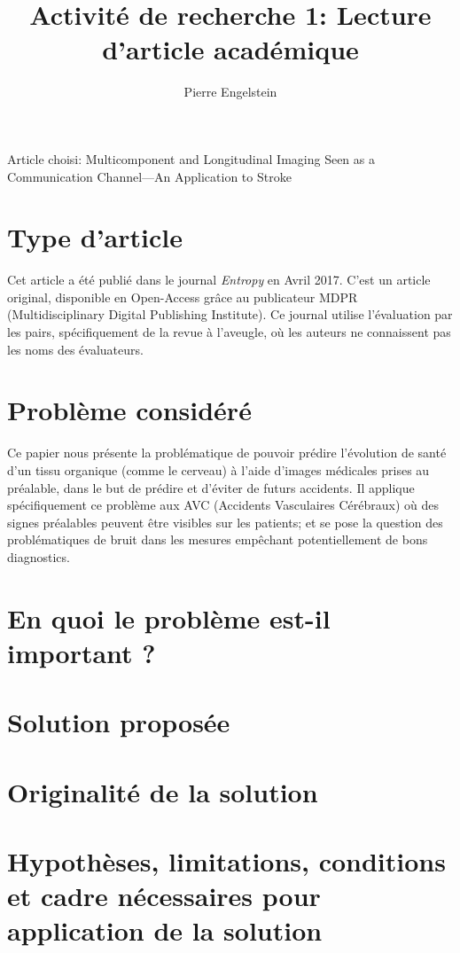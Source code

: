 \documentclass[12pt,a4paper]{article}
\title{Activité de recherche 1: Lecture d'article académique}
\author{Pierre Engelstein}
\date{}
\begin{document}
\maketitle

Article choisi: Multicomponent and Longitudinal Imaging Seen as a Communication Channel—An Application to Stroke

\section{Type d'article}

Cet article a été publié dans le journal \textit{Entropy} en Avril 2017. C'est un article original, disponible en Open-Access grâce au publicateur MDPR (Multidisciplinary Digital Publishing Institute). Ce journal utilise l'évaluation par les pairs, spécifiquement de la revue à l'aveugle, où les auteurs ne connaissent pas les noms des évaluateurs.

\section{Problème considéré}

Ce papier nous présente la problématique de pouvoir prédire l'évolution de santé d'un tissu organique (comme le cerveau) à l'aide d'images médicales prises au préalable, dans le but de prédire et d'éviter de futurs accidents. Il applique spécifiquement ce problème aux AVC (Accidents Vasculaires Cérébraux) où des signes préalables peuvent être visibles sur les patients; et se pose la question des problématiques de bruit dans les mesures empêchant potentiellement de bons diagnostics.

\section{En quoi le problème est-il important ?}

\section{Solution proposée}

\section{Originalité de la solution}

\section{Hypothèses, limitations, conditions et cadre nécessaires pour application de la solution}
\end{document}

